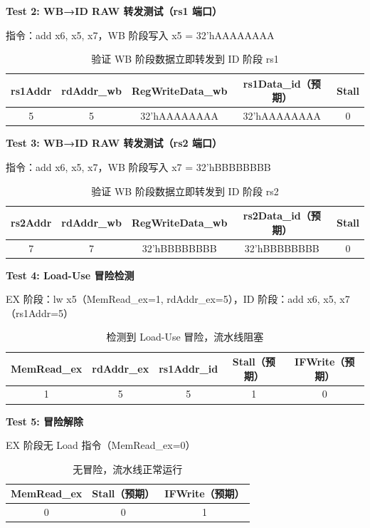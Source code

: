 \documentclass[12pt,a4paper]{article}
\begin{document}
\textbf{Test 2: WB→ID RAW 转发测试（rs1 端口）}

指令：add x6, x5, x7，WB 阶段写入 x5 = 32'hAAAAAAAA

\begin{table}[H]
\centering
\begin{tabular}{|c|c|c|c|c|}
\hline
rs1Addr & rdAddr\_wb & RegWriteData\_wb & rs1Data\_id（预期） & Stall \\ \hline
5 & 5 & 32'hAAAAAAAA & 32'hAAAAAAAA & 0 \\ \hline
\end{tabular}
\caption{验证 WB 阶段数据立即转发到 ID 阶段 rs1}
\end{table}

\textbf{Test 3: WB→ID RAW 转发测试（rs2 端口）}

指令：add x6, x5, x7，WB 阶段写入 x7 = 32'hBBBBBBBB

\begin{table}[H]
\centering
\begin{tabular}{|c|c|c|c|c|}
\hline
rs2Addr & rdAddr\_wb & RegWriteData\_wb & rs2Data\_id（预期） & Stall \\ \hline
7 & 7 & 32'hBBBBBBBB & 32'hBBBBBBBB & 0 \\ \hline
\end{tabular}
\caption{验证 WB 阶段数据立即转发到 ID 阶段 rs2}
\end{table}

\textbf{Test 4: Load-Use 冒险检测}

EX 阶段：lw x5（MemRead\_ex=1, rdAddr\_ex=5），ID 阶段：add x6, x5, x7（rs1Addr=5）

\begin{table}[H]
\centering
\begin{tabular}{|c|c|c|c|c|}
\hline
MemRead\_ex & rdAddr\_ex & rs1Addr\_id & Stall（预期） & IFWrite（预期） \\ \hline
1 & 5 & 5 & 1 & 0 \\ \hline
\end{tabular}
\caption{检测到 Load-Use 冒险，流水线阻塞}
\end{table}

\textbf{Test 5: 冒险解除}

EX 阶段无 Load 指令（MemRead\_ex=0）

\begin{table}[H]
\centering
\begin{tabular}{|c|c|c|}
\hline
MemRead\_ex & Stall（预期） & IFWrite（预期） \\ \hline
0 & 0 & 1 \\ \hline
\end{tabular}
\caption{无冒险，流水线正常运行}
\end{table}
\end{document}
